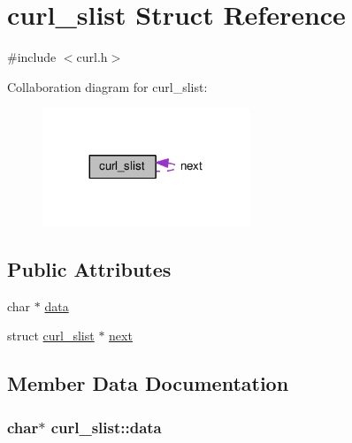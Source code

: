 \hypertarget{structcurl__slist}{}\section{curl\+\_\+slist Struct Reference}
\label{structcurl__slist}


{\ttfamily \#include $<$curl.\+h$>$}



Collaboration diagram for curl\+\_\+slist\+:
\nopagebreak
\begin{figure}[H]
\begin{center}
\leavevmode
\includegraphics[width=176pt]{structcurl__slist__coll__graph}
\end{center}
\end{figure}
\subsection*{Public Attributes}
\begin{DoxyCompactItemize}
\item 
char $\ast$ \hyperlink{structcurl__slist_a5fe4d926491a1c9b8b9a73c40505f601}{data}
\item 
struct \hyperlink{structcurl__slist}{curl\+\_\+slist} $\ast$ \hyperlink{structcurl__slist_a56fcfc41d89a47865933c310d316a108}{next}
\end{DoxyCompactItemize}


\subsection{Member Data Documentation}
\subsubsection[{\texorpdfstring{data}{data}}]{\setlength{\rightskip}{0pt plus 5cm}char$\ast$ curl\+\_\+slist\+::data}\hypertarget{structcurl__slist_a5fe4d926491a1c9b8b9a73c40505f601}{}\label{structcurl__slist_a5fe4d926491a1c9b8b9a73c40505f601}
